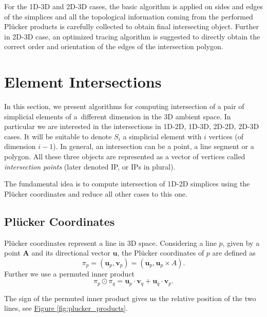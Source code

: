 \documentclass{elsarticle}
\newcommand{\fig}[1]{\hyperref[#1]{Figure \ref{#1}}}
\newcommand{\figpath}{figures/}
\def\vc#1{\mathbf{\boldsymbol{#1}}}     %
\newcommand{\plucker}{Pl\"{u}cker }
\begin{document}
\begin{figure}[!htb]
  \centering
  \setcounter{subfigure}{0}
  \hspace{10pt}
\end{figure}
      
For the 1D-3D and 2D-3D cases, the basic algorithm is applied on sides and edges of the simplices and 
all the topological information coming from the performed \plucker products is carefully collected
to obtain final intersecting object.
Further in 2D-3D case, an optimized tracing algorithm is suggested to directly obtain the correct order and 
orientation of the edges of the intersection polygon.


\section{Element Intersections}
\label{sec:elements_intersections}
In this section, we present algorithms for computing intersection of a pair of simplicial elements of a~different dimension in the 3D ambient space. 
In particular we are interested in the intersections in 1D-2D, 1D-3D, 2D-2D, 2D-3D cases.
It will be suitable to denote $S_i$ a simplicial element with $i$ vertices (of dimension $i-1$).
In general, an intersection can be a point, a line segment or a polygon.
All these three objects are represented as a vector of vertices called \emph{intersection points} 
(later denoted IP, or IPs in plural). 

The fundamental idea is to compute intersection of 1D-2D simplices using the 
\plucker coordinates and reduce all other cases to this one. 


\subsection{\plucker Coordinates}
\plucker coordinates represent a line in 3D space.
Considering a line $p$, given by a point $\vc A$ and its directional vector $\vc{u}$, 
the \plucker coordinates of $p$ are defined as
\[ \pi_p = (\vc{u}_p, \vc{v}_p) = (\vc{u}_p, \vc{u}_p\times A). \]
Further we use a permuted inner product
\[\pi_p \odot \pi_q = \vc{u}_p\cdot \vc{v}_q + \vc{u}_q \cdot \vc{v}_p. \]

The sign of the permuted inner product gives us the relative position of the two lines, 
see \fig{fig:plucker_products}.
\end{document}
